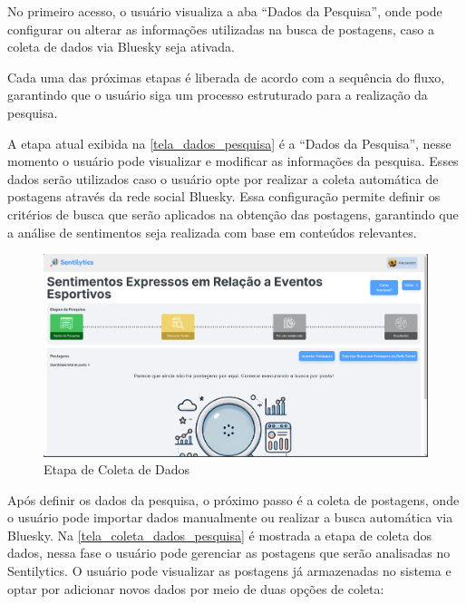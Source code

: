 \documentclass[
	12pt,				%
	oneside,			%
	a4paper,			%
	english,			%
	french,				%
	spanish,			%
	brazil				%
	]{abntex2}
\begin{document}
No primeiro acesso, o usuário visualiza a aba ``Dados da Pesquisa'',
onde pode configurar ou alterar as informações utilizadas na busca de
postagens, caso a coleta de dados via Bluesky seja ativada.

Cada uma das próximas etapas é liberada de acordo com a sequência do
fluxo, garantindo que o usuário siga um processo estruturado para a
realização da pesquisa.

A etapa atual exibida na \autoref{tela_dados_pesquisa} é a ``Dados da
Pesquisa'', nesse momento o usuário pode visualizar e modificar as
informações da pesquisa. Esses dados serão utilizados caso o usuário
opte por realizar a coleta automática de postagens através da rede
social Bluesky. Essa configuração permite definir os critérios de busca
que serão aplicados na obtenção das postagens, garantindo que a análise
de sentimentos seja realizada com base em conteúdos relevantes.

\begin{figure}[htbp]
\hypertarget{tela_coleta_dados_pesquisa}{%
\caption{Etapa de Coleta de Dados}\label{tela_coleta_dados_pesquisa}
\begin{center}
\includegraphics[scale=0.2]{imagens/sentilytics/interface-grafica/coleta-dados.png}
\end{center}
}
\end{figure}

Após definir os dados da pesquisa, o próximo passo é a coleta de
postagens, onde o usuário pode importar dados manualmente ou realizar a
busca automática via Bluesky. Na \autoref{tela_coleta_dados_pesquisa} é
mostrada a etapa de coleta dos dados, nessa fase o usuário pode
gerenciar as postagens que serão analisadas no Sentilytics. O usuário
pode visualizar as postagens já armazenadas no sistema e optar por
adicionar novos dados por meio de duas opções de coleta:
\end{document}
